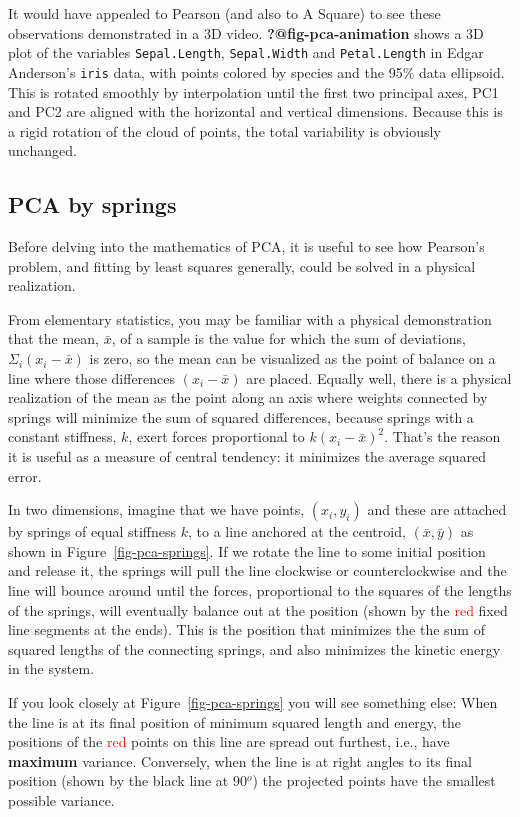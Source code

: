 \documentclass[
  letterpaper,
  10pt,
  krantz2]{krantz}
\begin{document}
It would have appealed to Pearson (and also to A Square) to see these
observations demonstrated in a 3D video. \textbf{?@fig-pca-animation}
shows a 3D plot of the variables \texttt{Sepal.Length},
\texttt{Sepal.Width} and \texttt{Petal.Length} in Edgar Anderson's
\texttt{iris} data, with points colored by species and the 95\% data
ellipsoid. This is rotated smoothly by interpolation until the first two
principal axes, PC1 and PC2 are aligned with the horizontal and vertical
dimensions. Because this is a rigid rotation of the cloud of points, the
total variability is obviously unchanged.

\subsection{PCA by springs}\label{pca-by-springs}

Before delving into the mathematics of PCA, it is useful to see how
Pearson's problem, and fitting by least squares generally, could be
solved in a physical realization.

From elementary statistics, you may be familiar with a physical
demonstration that the mean, \(\bar{x}\), of a sample is the value for
which the sum of deviations, \(\Sigma_i (x_i - \bar{x})\) is zero, so
the mean can be visualized as the point of balance on a line where those
differences \((x_i - \bar{x})\) are placed. Equally well, there is a
physical realization of the mean as the point along an axis where
weights connected by springs will minimize the sum of squared
differences, because springs with a constant stiffness, \(k\), exert
forces proportional to \(k (x_i - \bar{x}) ^2\). That's the reason it is
useful as a measure of central tendency: it minimizes the average
squared error.

In two dimensions, imagine that we have points, \((x_i, y_i)\) and these
are attached by springs of equal stiffness \(k\), to a line anchored at
the centroid, \((\bar{x}, \bar{y})\) as shown in
Figure~\ref{fig-pca-springs}. If we rotate the line to some initial
position and release it, the springs will pull the line clockwise or
counterclockwise and the line will bounce around until the forces,
proportional to the squares of the lengths of the springs, will
eventually balance out at the position (shown by the
\textcolor{red}{red} fixed line segments at the ends). This is the
position that minimizes the the sum of squared lengths of the connecting
springs, and also minimizes the kinetic energy in the system.

If you look closely at Figure~\ref{fig-pca-springs} you will see
something else: When the line is at its final position of minimum
squared length and energy, the positions of the \textcolor{red}{red}
points on this line are spread out furthest, i.e., have \textbf{maximum}
variance. Conversely, when the line is at right angles to its final
position (shown by the black line at 90\(^o\)) the projected points have
the smallest possible variance.
\end{document}
